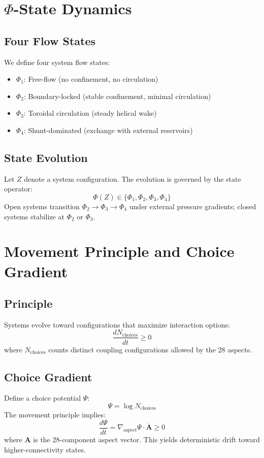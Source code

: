 \section{$\Phi$-State Dynamics}

\subsection{Four Flow States}
We define four system flow states:
\begin{itemize}
\item $\Phi_1$: Free-flow (no confinement, no circulation)
\item $\Phi_2$: Boundary-locked (stable confinement, minimal circulation)
\item $\Phi_3$: Toroidal circulation (steady helical wake)
\item $\Phi_4$: Shunt-dominated (exchange with external reservoirs)
\end{itemize}

\subsection{State Evolution}
Let $Z$ denote a system configuration. The evolution is governed by the state operator:
\begin{equation}
\Phi(Z) \in \{\Phi_1, \Phi_2, \Phi_3, \Phi_4\}
\end{equation}
Open systems transition $\Phi_2 \to \Phi_3 \to \Phi_4$ under external pressure gradients; closed systems stabilize at $\Phi_2$ or $\Phi_3$.

\section{Movement Principle and Choice Gradient}

\subsection{Principle}
Systems evolve toward configurations that maximize interaction options:
\begin{equation}
\frac{dN_{\text{choices}}}{dt} \ge 0
\end{equation}
where $N_{\text{choices}}$ counts distinct coupling configurations allowed by the 28 aspects.

\subsection{Choice Gradient}
Define a choice potential $\Psi$:
\begin{equation}
\Psi = \log N_{\text{choices}}
\end{equation}
The movement principle implies:
\begin{equation}
\frac{d\Psi}{dt} = \nabla_{\text{aspect}} \Psi \cdot \dot{\mathbf{A}} \ge 0
\end{equation}
where $\mathbf{A}$ is the 28-component aspect vector. This yields deterministic drift toward higher-connectivity states.

